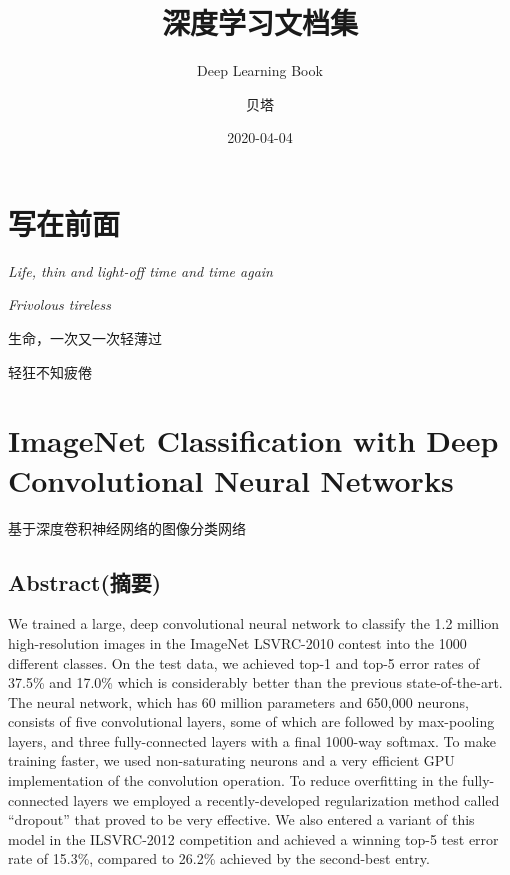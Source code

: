 \documentclass[12pt,a4paper,UTF8,twoside]{book}
\title{深度学习文档集}
\subtitle{Deep Learning Book}
\author{贝塔}
\date{2020-04-04}
\begin{document}





{
\setcounter{tocdepth}{2}
\tableofcontents
}

\hypertarget{ux5199ux5728ux524dux9762}{%
\chapter{写在前面}\label{ux5199ux5728ux524dux9762}}

\emph{Life, thin and light-off time and time again}

\emph{Frivolous tireless}

生命，一次又一次轻薄过

轻狂不知疲倦

\hypertarget{Alexnet}{%
\chapter{ImageNet Classification with Deep Convolutional Neural Networks}\label{Alexnet}}

基于深度卷积神经网络的图像分类网络

\hypertarget{abstractux6458ux8981}{%
\section{Abstract(摘要)}\label{abstractux6458ux8981}}

We trained a large, deep convolutional neural network to classify the 1.2 million high-resolution images in the ImageNet LSVRC-2010 contest into the 1000 different classes. On the test data, we achieved top-1 and top-5 error rates of 37.5\% and 17.0\% which is considerably better than the previous state-of-the-art. The neural network, which has 60 million parameters and 650,000 neurons, consists of five convolutional layers, some of which are followed by max-pooling layers, and three fully-connected layers with a final 1000-way softmax. To make training faster, we used non-saturating neurons and a very efficient GPU implementation of the convolution operation. To reduce overfitting in the fully-connected layers we employed a recently-developed regularization method called ``dropout'' that proved to be very effective. We also entered a variant of this model in the ILSVRC-2012 competition and achieved a winning top-5 test error rate of 15.3\%, compared to 26.2\% achieved by the second-best entry.
\end{document}

